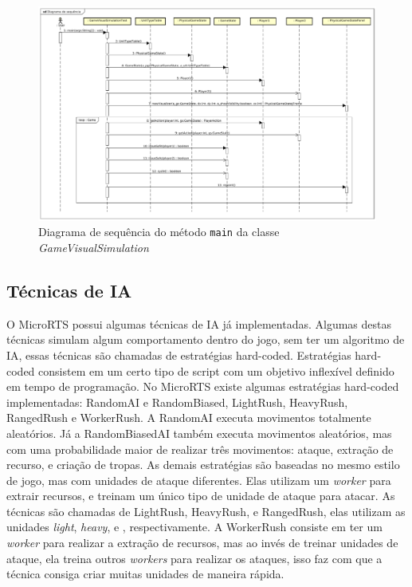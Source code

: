 \begin{figure}[ht]
	\centering
	\includegraphics[width=1\textwidth]{fig/diagramaSequencia.pdf}
	\caption{Diagrama de sequência do método \texttt{main} da classe \textit{GameVisualSimulation}}
	\label{fig:sequencia}
\end{figure}

\subsection{Técnicas de IA} \label{sec:tecn}

O MicroRTS possui algumas técnicas de IA já implementadas.
Algumas destas técnicas simulam algum comportamento dentro do jogo, sem ter um algoritmo de IA, essas técnicas são chamadas de estratégias hard-coded. 
Estratégias hard-coded consistem em um certo tipo de script com um objetivo inflexível definido em tempo de programação.
No MicroRTS existe algumas estratégias hard-coded implementadas: RandomAI e RandomBiased, LightRush, HeavyRush, RangedRush e WorkerRush.
A RandomAI executa movimentos totalmente aleatórios.
Já a RandomBiasedAI também executa movimentos aleatórios, mas com uma probabilidade maior de realizar três movimentos: ataque, extração de recurso, e criação de tropas.
As demais estratégias são baseadas no mesmo estilo de jogo, mas com unidades de ataque diferentes.
Elas utilizam um \textit{worker} para extrair recursos, e treinam um único tipo de unidade de ataque para atacar. 
As técnicas são chamadas de LightRush, HeavyRush, e RangedRush, elas utilizam as unidades \textit{light}, \textit{heavy}, e , respectivamente.
A WorkerRush consiste em ter um \textit{worker} para realizar a extração de recursos, mas ao invés de treinar unidades de ataque, ela treina outros \textit{workers} para realizar os ataques, isso faz com que a técnica consiga criar muitas unidades de maneira rápida.

